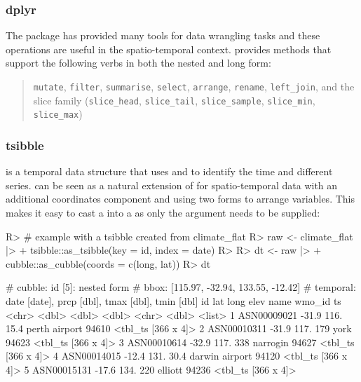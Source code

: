 \documentclass[
]{jss}
\begin{document}
\hypertarget{dplyr}{%
\subsubsection{dplyr}\label{dplyr}}

The  package has provided many tools for data wrangling
tasks and these operations are useful in the spatio-temporal context.
 provides methods that support the following 
verbs in both the nested and long form:

\begin{quote}
\texttt{mutate}, \texttt{filter}, \texttt{summarise}, \texttt{select},
\texttt{arrange}, \texttt{rename}, \texttt{left\_join}, and the slice
family (\texttt{slice\_head}, \texttt{slice\_tail},
\texttt{slice\_sample}, \texttt{slice\_min}, \texttt{slice\_max})
\end{quote}

\hypertarget{tsibble}{%
\subsubsection{tsibble}\label{tsibble}}

 is a temporal data structure that uses  and
 to identify the time and different series.  can
be seen as a natural extension of  for spatio-temporal
data with an additional coordinates component and using two forms to
arrange variables. This makes it easy to cast a  into a
 as only the  argument needs to be supplied:

\begin{CodeChunk}
\begin{CodeInput}
R> # example with a tsibble created from climate_flat
R> raw <- climate_flat |>
+   tsibble::as_tsibble(key = id, index = date)
R> 
R> dt <-  raw |>
+   cubble::as_cubble(coords = c(long, lat))
R> dt
\end{CodeInput}
\begin{CodeOutput}
# cubble:   id [5]: nested form
# bbox:     [115.97, -32.94, 133.55, -12.42]
# temporal: date [date], prcp [dbl], tmax [dbl], tmin [dbl]
  id            lat  long  elev name           wmo_id ts                
  <chr>       <dbl> <dbl> <dbl> <chr>           <dbl> <list>            
1 ASN00009021 -31.9  116.  15.4 perth airport   94610 <tbl_ts [366 x 4]>
2 ASN00010311 -31.9  117. 179   york            94623 <tbl_ts [366 x 4]>
3 ASN00010614 -32.9  117. 338   narrogin        94627 <tbl_ts [366 x 4]>
4 ASN00014015 -12.4  131.  30.4 darwin airport  94120 <tbl_ts [366 x 4]>
5 ASN00015131 -17.6  134. 220   elliott         94236 <tbl_ts [366 x 4]>
\end{CodeOutput}
\end{CodeChunk}
\end{document}
